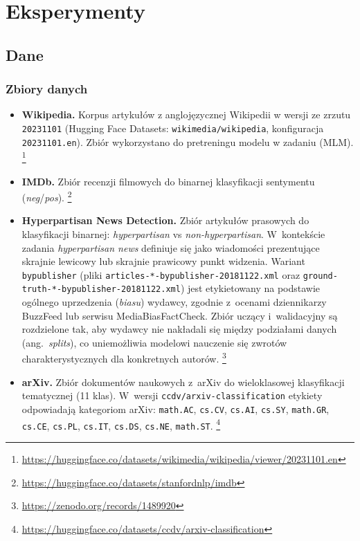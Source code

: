 \documentclass[a4paper,11pt,twoside]{report}
\theoremstyle{definition}
\begin{document}
\chapter{Eksperymenty}\label{sec:experiments}

\section{Dane}

\subsection{Zbiory danych}


\begin{itemize}
  \item \textbf{Wikipedia.}
  Korpus artykułów z anglojęzycznej Wikipedii w wersji ze zrzutu \texttt{20231101} (Hugging Face Datasets: \texttt{wikimedia/wikipedia}, konfiguracja \texttt{20231101.en}).
  Zbiór wykorzystano do pretreningu modelu w zadaniu (MLM).
  \footnote{\url{https://huggingface.co/datasets/wikimedia/wikipedia/viewer/20231101.en}}

  \item \textbf{IMDb.}
  Zbiór recenzji filmowych do binarnej klasyfikacji sentymentu (\textit{neg}/\textit{pos}).
  \footnote{\url{https://huggingface.co/datasets/stanfordnlp/imdb}}



  \item \textbf{Hyperpartisan News Detection.}
  Zbiór artykułów prasowych do klasyfikacji binarnej: \textit{hyperpartisan} vs \textit{non-hyperpartisan}.
  W~kontekście zadania \textit{hyperpartisan news} definiuje się jako wiadomości prezentujące skrajnie lewicowy lub skrajnie prawicowy punkt widzenia. Wariant \texttt{bypublisher} (pliki \texttt{articles-*-bypublisher-20181122.xml} oraz \texttt{ground-truth-*-bypublisher-20181122.xml}) jest etykietowany na podstawie ogólnego uprzedzenia (\textit{biasu}) wydawcy, zgodnie z~ocenami dziennikarzy BuzzFeed lub serwisu MediaBiasFactCheck.
  Zbiór uczący i~walidacyjny są rozdzielone tak, aby wydawcy nie nakładali się między podziałami danych (ang.\ \textit{splits}), co uniemożliwia modelowi nauczenie się zwrotów charakterystycznych dla konkretnych autorów.
  \footnote{\url{https://zenodo.org/records/1489920}}

  \item \textbf{arXiv.}
  Zbiór dokumentów naukowych z~arXiv do wieloklasowej klasyfikacji tematycznej (11 klas).
  W~wersji \texttt{ccdv/arxiv-classification} etykiety odpowiadają kategoriom arXiv:
  \texttt{math.AC}, \texttt{cs.CV}, \texttt{cs.AI}, \texttt{cs.SY}, \texttt{math.GR}, \texttt{cs.CE},
  \texttt{cs.PL}, \texttt{cs.IT}, \texttt{cs.DS}, \texttt{cs.NE}, \texttt{math.ST}.
  \footnote{\url{https://huggingface.co/datasets/ccdv/arxiv-classification}}

  
\end{itemize}
\end{document}
